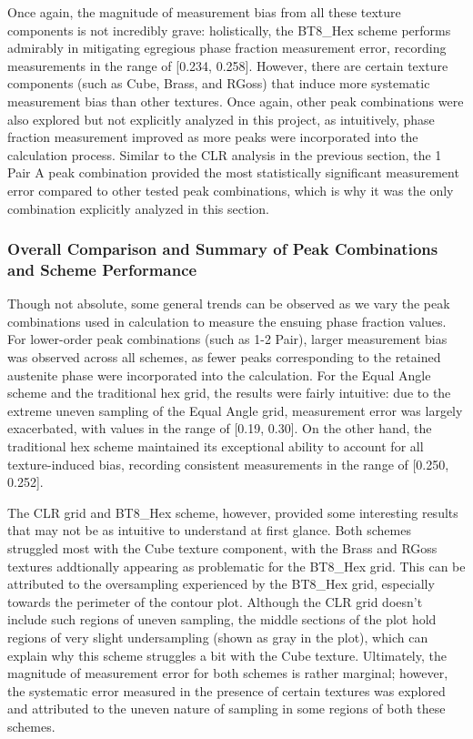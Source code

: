 \documentclass[10pt]{article}
\begin{document}
Once again, the magnitude of measurement bias from all these texture components is not incredibly grave: holistically, the BT8\_Hex scheme
performs admirably in mitigating egregious phase fraction measurement error, recording measurements in the range of [0.234, 0.258]. However,
there are certain texture components (such as Cube, Brass, and RGoss) that induce more systematic measurement bias than other textures. Once again, 
other peak combinations were also explored but not explicitly analyzed in this project, as intuitively, phase fraction measurement improved 
as more peaks were incorporated into the calculation process. Similar to the CLR analysis in the previous section, the 1 Pair A peak combination provided the most statistically significant
measurement error compared to other tested peak combinations, which is why it was the only combination explicitly analyzed in this section.

\subsubsection{Overall Comparison and Summary of Peak Combinations and Scheme Performance}
Though not absolute, some general trends can be observed as we vary the peak combinations used in calculation to measure the ensuing phase fraction 
values. For lower-order peak combinations (such as 1-2 Pair), larger measurement bias was observed across all schemes, as fewer peaks 
corresponding to the retained austenite phase were incorporated into the calculation. For the Equal Angle scheme 
and the traditional hex grid, the results were fairly intuitive: due to the extreme uneven sampling of the Equal Angle grid, 
measurement error was largely exacerbated, with values in the range of [0.19, 0.30]. On the other hand, the traditional hex scheme maintained 
its exceptional ability to account for all texture-induced bias, recording consistent measurements in the range of [0.250, 0.252].

The CLR grid and BT8\_Hex scheme, however, provided some interesting results that may not be as intuitive to understand at first glance.
Both schemes struggled most with the Cube texture component, with the Brass and RGoss textures addtionally appearing as problematic for the 
BT8\_Hex grid. This can be attributed to the oversampling experienced by the BT8\_Hex grid, especially towards the perimeter of the 
contour plot. Although the CLR grid doesn’t include such regions of uneven sampling, the middle sections of the plot hold regions of very slight 
undersampling (shown as gray in the plot), which can explain why this scheme struggles a bit with the Cube texture. Ultimately, the magnitude of 
measurement error for both schemes is rather marginal; however, the systematic error measured in the presence of certain textures was explored and 
attributed to the uneven nature of sampling in some regions of both these schemes.
\end{document}
